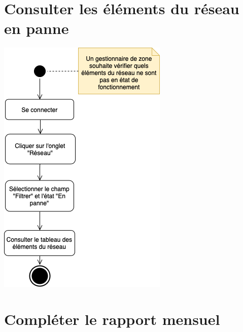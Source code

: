 \documentclass{EPL-master-thesis-covers-FR}
\begin{document}
		\section*{Consulter les éléments du réseau en panne}

			\begin{center}
				\includegraphics[scale=.5]{images/activity_broken}
			\end{center}

		\section*{Compléter le rapport mensuel}
\end{document}
